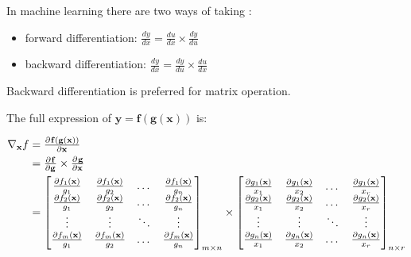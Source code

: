 \begin{definition}     
In machine learning there are two ways of taking :
\begin{itemize}
	\item forward differentiation: $\frac{dy}{dx} =\frac{du}{dx} \times \frac{dy}{du}$
	\item backward differentiation: $\frac{dy}{dx}=\frac{dy}{du} \times \frac{du}{dx}$
\end{itemize}

Backward differentiation is preferred for matrix operation.



The full expression of $\mathbf{y}=\mathbf{f}(\mathbf{g}(\mathbf{x}))$ is:

\begin{equation}
\begin{aligned}
	\nabla{}_{\mathbf{x}} f &=  \pd{\mathbf{f}(\mathbf{g}(\mathbf{x}))}{\mathbf{x}} \\
	&= \pd{\mathbf{f}}{\mathbf{g}} \times \pd{\mathbf{g}}{\mathbf{x}} \\
	&= \left [ \begin{matrix}
\frac{\partial f_1({\mathbf{x}})}{g_1} & \frac{\partial f_1({\mathbf{x}})}{g_2} & \dots & \frac{\partial f_1({\mathbf{x}})}{g_n} \\
\frac{\partial f_2({\mathbf{x}})}{g_1} & \frac{\partial f_2({\mathbf{x}})}{g_2} & \dots & \frac{\partial f_2({\mathbf{x}})}{g_n} \\
\vdots & \vdots & \ddots & \vdots  \\
\frac{\partial f_m({\mathbf{x}})}{g_1} & \frac{\partial f_m({\mathbf{x}})}{g_2} & \dots & \frac{\partial f_m({\mathbf{x}})}{g_n}
\end{matrix} \right ]_{m \times n}
\times %
\left [ \begin{matrix}
\frac{\partial g_1({\mathbf{x}})}{x_1} & \frac{\partial g_1({\mathbf{x}})}{x_2} & \dots & \frac{\partial g_1({\mathbf{x}})}{x_r} \\
\frac{\partial g_2({\mathbf{x}})}{x_1} & \frac{\partial g_2({\mathbf{x}})}{x_2} & \dots & \frac{\partial g_2({\mathbf{x}})}{x_r} \\
\vdots & \vdots & \ddots & \vdots  \\
\frac{\partial g_n({\mathbf{x}})}{x_1} & \frac{\partial g_n({\mathbf{x}})}{x_2} & \dots & \frac{\partial g_n({\mathbf{x}})}{x_r}
\end{matrix} \right ]_{n \times r}
\end{aligned}
\end{equation}
\end{definition}


